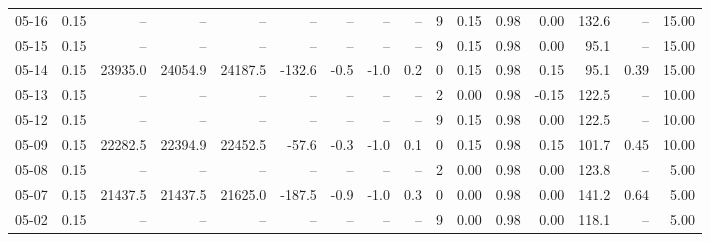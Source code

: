 \begin{threeparttable}
{\begin{tabular}{lrrrrrrrrrrrrrrr}
  05-16 &     0.15 &      -- &      -- &      -- &         -- &             -- &                       -- &                  -- &              9 &       0.15 &      0.98 &           0.00 &            132.6 &              -- &                  15.00 \\
  05-15 &     0.15 &      -- &      -- &      -- &         -- &             -- &                       -- &                  -- &              9 &       0.15 &      0.98 &           0.00 &             95.1 &              -- &                  15.00 \\
  05-14 &     0.15 & 23935.0 & 24054.9 & 24187.5 &     -132.6 &           -0.5 &                     -1.0 &                 0.2 &              0 &       0.15 &      0.98 &           0.15 &             95.1 &            0.39 &                  15.00 \\
  05-13 &     0.15 &      -- &      -- &      -- &         -- &             -- &                       -- &                  -- &              2 &       0.00 &      0.98 &          -0.15 &            122.5 &              -- &                  10.00 \\
  05-12 &     0.15 &      -- &      -- &      -- &         -- &             -- &                       -- &                  -- &              9 &       0.15 &      0.98 &           0.00 &            122.5 &              -- &                  10.00 \\
  05-09 &     0.15 & 22282.5 & 22394.9 & 22452.5 &      -57.6 &           -0.3 &                     -1.0 &                 0.1 &              0 &       0.15 &      0.98 &           0.15 &            101.7 &            0.45 &                  10.00 \\
  05-08 &     0.15 &      -- &      -- &      -- &         -- &             -- &                       -- &                  -- &              2 &       0.00 &      0.98 &           0.00 &            123.8 &              -- &                   5.00 \\
  05-07 &     0.15 & 21437.5 & 21437.5 & 21625.0 &     -187.5 &           -0.9 &                     -1.0 &                 0.3 &              0 &       0.00 &      0.98 &           0.00 &            141.2 &            0.64 &                   5.00 \\
  05-02 &     0.15 &      -- &      -- &      -- &         -- &             -- &                       -- &                  -- &              9 &       0.00 &      0.98 &           0.00 &            118.1 &              -- &                   5.00 \\

\end{tabular}}
\end{threeparttable}
